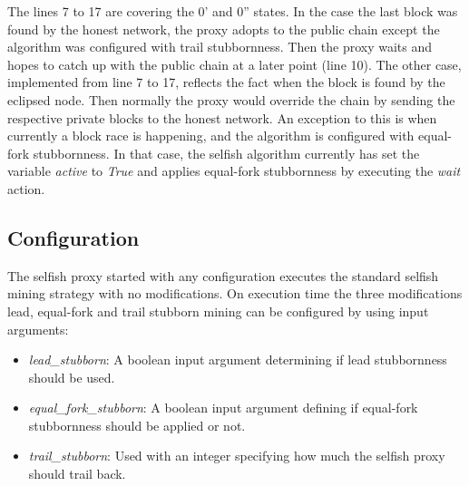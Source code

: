 The lines 7 to 17 are covering the 0' and 0'' states.
In the case the last block was found by the honest network, the proxy adopts to the public chain except the algorithm was configured with trail stubbornness.
Then the proxy waits and hopes to catch up with the public chain at a later point (line 10).
The other case, implemented from line 7 to 17, reflects the fact when the block is found by the eclipsed node.
Then normally the proxy would override the chain by sending the respective private blocks to the honest network.
An exception to this is when currently a block race is happening, and the algorithm is configured with equal-fork stubbornness.
In that case, the selfish algorithm currently has set the variable \textit{active} to \textit{True} and applies equal-fork stubbornness by executing the \textit{wait} action.

\subsection{Configuration}

The selfish proxy started with any configuration executes the standard selfish mining strategy with no modifications.
On execution time the three modifications lead, equal-fork and trail stubborn mining can be configured by using input arguments:

\begin{itemize}
	\item \textit{lead\_stubborn}:
	A boolean input argument determining if lead stubbornness should be used. 
	\item \textit{equal\_fork\_stubborn}:
	A boolean input argument defining if equal-fork stubbornness should be applied or not.
	\item \textit{trail\_stubborn}:
	Used with an integer specifying how much the selfish proxy should trail back.
\end{itemize}

